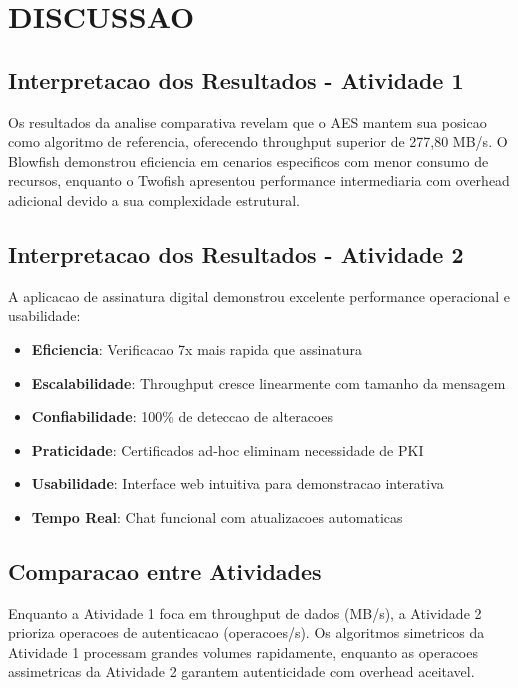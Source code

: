 \documentclass[12pt,a4paper,oneside]{article}
\begin{document}
\section{DISCUSSAO}

\subsection{Interpretacao dos Resultados - Atividade 1}

Os resultados da analise comparativa revelam que o AES mantem sua posicao como algoritmo de referencia, oferecendo throughput superior de 277,80 MB/s. O Blowfish demonstrou eficiencia em cenarios especificos com menor consumo de recursos, enquanto o Twofish apresentou performance intermediaria com overhead adicional devido a sua complexidade estrutural.

\subsection{Interpretacao dos Resultados - Atividade 2}

A aplicacao de assinatura digital demonstrou excelente performance operacional e usabilidade:

\begin{itemize}
    \item \textbf{Eficiencia}: Verificacao 7x mais rapida que assinatura
    \item \textbf{Escalabilidade}: Throughput cresce linearmente com tamanho da mensagem
    \item \textbf{Confiabilidade}: 100\% de deteccao de alteracoes
    \item \textbf{Praticidade}: Certificados ad-hoc eliminam necessidade de PKI
    \item \textbf{Usabilidade}: Interface web intuitiva para demonstracao interativa
    \item \textbf{Tempo Real}: Chat funcional com atualizacoes automaticas
\end{itemize}

\subsection{Comparacao entre Atividades}

Enquanto a Atividade 1 foca em throughput de dados (MB/s), a Atividade 2 prioriza operacoes de autenticacao (operacoes/s). Os algoritmos simetricos da Atividade 1 processam grandes volumes rapidamente, enquanto as operacoes assimetricas da Atividade 2 garantem autenticidade com overhead aceitavel.
\end{document}
